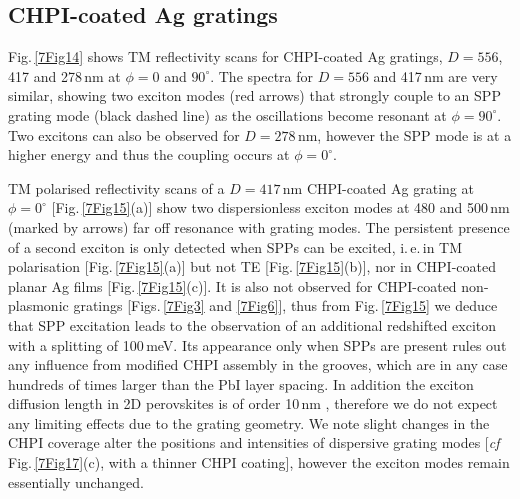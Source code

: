 \subsection{CHPI-coated Ag gratings}
Fig.\,\ref{7Fig14} shows TM reflectivity scans for CHPI-coated Ag gratings, $D=556$, 417 and 278\,nm at $\phi=0$ and $90^{\circ}$. The spectra for $D=556$ and 417\,nm are very similar, showing two exciton modes (red arrows) that strongly couple to an SPP grating mode (black dashed line) as the oscillations become resonant at $\phi=90^{\circ}$. Two excitons can also be observed for $D=278$\,nm, however the SPP mode is at a higher energy and thus the coupling occurs at $\phi=0^{\circ}$.

TM polarised reflectivity scans of a $D=417$\,nm CHPI-coated Ag grating at $\phi=0^{\circ}$ [Fig.\,\ref{7Fig15}(a)] show two dispersionless exciton modes at 480 and 500\,nm (marked by arrows) far off resonance with grating modes. The persistent presence of a second exciton is only detected when SPPs can be excited, i.\,e.\,in TM polarisation [Fig.\,\ref{7Fig15}(a)] but not TE [Fig.\,\ref{7Fig15}(b)], nor in CHPI-coated planar Ag films [Fig.\,\ref{7Fig15}(c)]. It is also not observed for CHPI-coated non-plasmonic gratings [Figs.\,\ref{7Fig3} and \ref{7Fig6}], thus from Fig.\,\ref{7Fig15} we deduce that SPP excitation leads to the observation of an additional redshifted exciton with a splitting of 100\,meV. Its appearance only when SPPs are present rules out any influence from modified CHPI assembly in the grooves, which are in any case hundreds of times larger than the PbI layer spacing. In addition the exciton diffusion length in 2D perovskites is of order 10\,nm \cite{Ahmad2013}, therefore we do not expect any limiting effects due to the grating geometry. We note slight changes in the CHPI coverage alter the positions and intensities of dispersive grating modes [\textit{cf} Fig.\,\ref{7Fig17}(c), with a thinner CHPI coating], however the exciton modes remain essentially unchanged.

